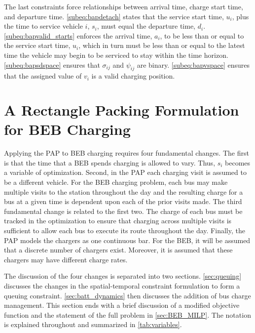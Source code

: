 \documentclass[utf8]{FrontiersinHarvard}
\begin{document}
The last constraints force relationships between arrival time, charge start time, and departure time.
\autoref{subeq:bapdetach} states that the service start time, \(u_i\), plus the time to service vehicle \(i\), \(s_i\), must
equal the departure time, \(d_i\). \autoref{subeq:bapvalid_starts} enforces the arrival time, \(a_i\), to be less than or
equal to the service start time, \(u_i\), which in turn must be less than or equal to the latest time the vehicle may
begin to be serviced to stay within the time horizon. \autoref{subeq:bapsdspace} ensures that \(\sigma_{ij}\) and
\(\psi_{ij}\) are binary. \autoref{subeq:bapvspace} ensures that the assigned value of \(v_i\) is a valid charging position.
\section{A Rectangle Packing Formulation for BEB Charging}
\label{sec:problemformulation}
Applying the PAP to BEB charging requires four fundamental changes. The first is that the time that a BEB spends
charging is allowed to vary. Thus, \(s_i\) becomes a variable of optimization. Second, in the PAP each charging visit is
assumed to be a different vehicle. For the BEB charging problem, each bus may make multiple visits to the station
throughout the day and the resulting charge for a bus at a given time is dependent upon each of the prior visits made.
The third fundamental change is related to the first two. The charge of each bus must be tracked in the optimization to
ensure that charging across multiple visits is sufficient to allow each bus to execute its route throughout the day.
Finally, the PAP models the chargers as one continuous bar. For the BEB, it will be assumed that a discrete number of
chargers exist. Moreover, it is assumed that these chargers may have different charge rates.

The discussion of the four changes is separated into two sections. \autoref{sec:queuing} discusses the changes in the
spatial-temporal constraint formulation to form a queuing constraint. \autoref{sec:batt_dynamics} then discusses the
addition of bus charge management. This section ends with a brief discussion of a modified objective function and the
statement of the full problem in \autoref{sec:BEB_MILP}. The notation is explained throughout and summarized in
\autoref{tab:variables}.
\end{document}
